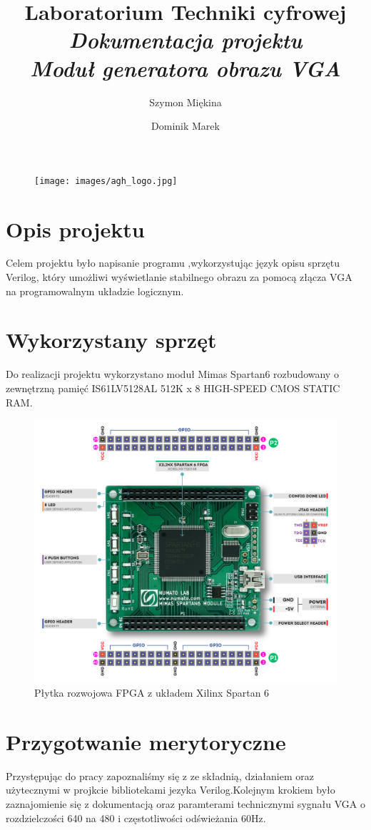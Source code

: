\documentclass[12pt, a4paper]{article}
\title {\textbf{\fontsize{25}{29}\selectfont Laboratorium Techniki cyfrowej\\ 
\fontsize{17}{22}\selectfont \textit{Dokumentacja projektu}\\
\fontsize{17}{22}\selectfont \textit{Moduł generatora obrazu VGA}}}
\author{\fontsize{14}{10}\selectfont Szymon Miękina}
\date{\fontsize{14}{10}\selectfont Dominik Marek}
\begin{document}
\maketitle
\begin{figure}[h]
    \centering
    \texttt{[image: images/agh\_logo.jpg]}
\end{figure}
\newpage
\tableofcontents
\section{Opis projektu}
Celem projektu było  napisanie programu ,wykorzystując język opisu sprzętu Verilog, który
umożliwi  wyświetlanie stabilnego obrazu za pomocą złącza VGA na programowalnym układzie
logicznym.

\section{Wykorzystany sprzęt}
Do realizacji projektu wykorzystano moduł Mimas Spartan6 rozbudowany o zewnętrzną pamięć IS61LV5128AL 512K x 8 HIGH-SPEED CMOS STATIC RAM.
\begin{figure}[h]
    \centering
    \includegraphics[scale=0.8]{images/spartan6_scheme.png}
     \caption{Płytka rozwojowa FPGA z układem Xilinx Spartan 6}
\end{figure}
\newpage
\section{Przygotwanie merytoryczne}
Przystępując do pracy zapoznaliśmy się z ze składnią, działaniem oraz użytecznymi w projkcie bibliotekami jezyka Verilog.Kolejnym krokiem było zaznajomienie się z dokumentacją oraz paramterami technicznymi sygnału VGA o rozdzielczości 640 na 480 i częstotliwości odświeżania 60Hz. 
\end{document}
